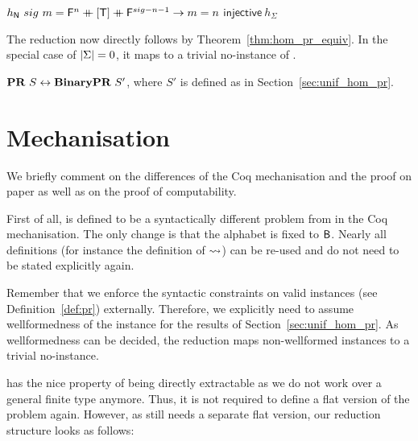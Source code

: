 \begin{fact}[Injectivity]\leavevmode
  \begin{enumerate}
    \coqitem[hP_inv1] $h_{\mathsf{N}}~sig~m = \mathsf{F}^n \mathbin{+\mkern-10mu+} [\mathsf{T}] \mathbin{+\mkern-10mu+} \mathsf{F}^{sig - n - 1} \rightarrow m = n$
    \coqitem[hP_injective] $\textsf{injective}~h_{\Sigma}$
  \end{enumerate}
\end{fact}

The reduction now directly follows by Theorem~\ref{thm:hom_pr_equiv}.
In the special case of $|\Sigma| = 0$, it maps to a trivial no-instance of \BPR{}. 

\begin{lemma}
  $\textbf{PR}{}~S \leftrightarrow \textbf{BinaryPR}{}~S'$,
  where $S'$ is defined as in Section~\ref{sec:unif_hom_pr}.
\end{lemma}

\section{Mechanisation}
We briefly comment on the differences of the Coq mechanisation and the proof on paper as well as on the proof of computability. 

First of all, \BPR{} is defined to be a syntactically different problem from \PR{} in the Coq mechanisation. The only change is that the alphabet is fixed to $\textsf{B}$. Nearly all definitions (for instance the definition of $\rightsquigarrow_{}$) can be re-used and do not need to be stated explicitly again.

Remember that we enforce the syntactic constraints on valid \PR{} instances (see Definition~\ref{def:pr}) externally. Therefore, we explicitly need to assume wellformedness of the \PR{} instance for the results of Section~\ref{sec:unif_hom_pr}. As wellformedness can be decided, the reduction maps non-wellformed instances to a trivial no-instance.

\BPR{} has the nice property of being directly extractable as we do not work over a general finite type anymore. Thus, it is not required to define a flat version of the problem again. However, as \PR{} still needs a separate flat version, our reduction structure looks as follows:
\begin{center}
\end{center}

